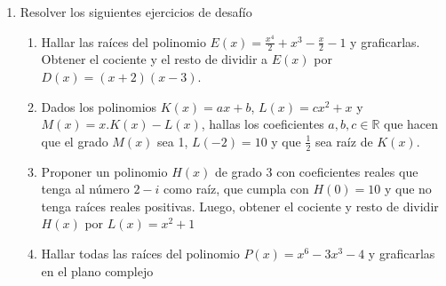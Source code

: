 \documentclass[a4paper]{article}
\newcommand{\answer}{\item[**]}
\newcommand{\exercise}{\item}
\newcommand{\df}[2]{\displaystyle\frac{#1}{#2}}
\begin{document}
\begin{enumerate}
\begin{enumerate} [label=(\alph*)]
		\item El \textit{factor de compresibilidad} de un gas ideal es $Z=1$. Sin embargo, en la vida real el coeficiente se puede expresar como un polinomio donde la variable es el volumen molar recíproco: $Z\left(\frac{1}{V_m}\right)=1+B\left(\frac{1}{V_m}\right)+C\left(\frac{1}{V_m}\right)^2+D\left(\frac{1}{V_m}\right)^3 + \cdots$. Los coeficientes $B$, $C$ y $D$ se denominan segundo, tercer y cuarto coeficiente virial, respectivamente. A la temperatura de 273 kelvin, los coeficientes del gas argón B y C son $-21.7$ (en $\frac{\text{cm}^3}{\text{mol}}$) y $1200$ (en $\frac{\text{cm}^6}{\text{mol}^2}$), respectivamente, y los demás se consideran despreciables (cero). Escribir el polinomio $Z\left(\frac{1}{V_m}\right)$ y calcular el \textit{factor de compresibilidad} de una muestra de gas argón que presenta un volúmen molar de $540~\frac{\text{cm}^3}{\text{mol}}$ a 273 kelvin.
		\answer Como los coeficientes y la muestra corresponden a la misma temperatura (273 kelvin) los podemos usar en conjunto. El factor de compresibilidad será $Z\left(\frac{1}{V_m}\right)=1-21.7\left(\frac{1}{V_m}\right)+1200\left(\frac{1}{V_m}\right)^2$. Introducimos el volumen molar y obtenemos $Z\left(\frac{1}{540}\right)=1-21.7\left(\frac{1}{540}\right)+1200\left(\frac{1}{540}\right)^2 \simeq 0.9589$.

	\end{enumerate}

	\exercise Resolver los siguientes ejercicios de desafío
	\begin{enumerate} [label=(\alph*)]
		
		\item Hallar las raíces del polinomio $E(x)=\df{x^4}{2}+x^3-\df{x}{2}-1$ y graficarlas. Obtener el cociente y el resto de dividir a $E(x)$ por $D(x)=(x+2)(x-3)$.

		\item Dados los polinomios $K(x)=ax+b$, $L(x)=cx^2+x$ y $M(x)=x.K(x)-L(x)$, hallas los coeficientes $a,b,c \in \mathbb{R}$ que hacen que el grado $M(x)$ sea 1, $L(-2)=10$ y que $\df{1}{2}$ sea raíz de $K(x)$.

		\item Proponer un polinomio $H(x)$ de grado 3 con coeficientes reales que tenga al número $2-i$ como raíz, que cumpla con $H(0)=10$ y que no tenga raíces reales positivas. Luego, obtener el cociente y resto de dividir $H(x)$ por $L(x)=x^2+1$

		\item Hallar todas las raíces del polinomio $P(x)=x^6-3x^3-4$ y graficarlas en el plano complejo


\end{enumerate}
\end{enumerate}
\end{document}

